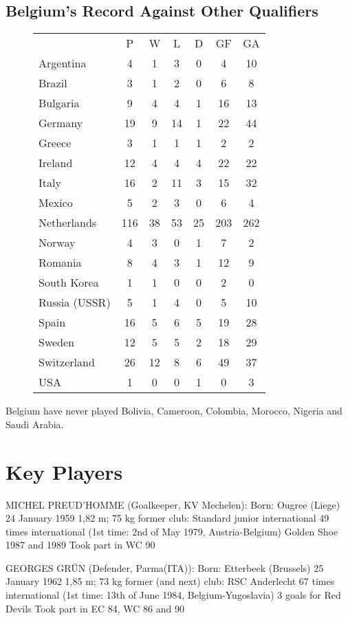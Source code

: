 \subsection{Belgium's Record Against Other Qualifiers}
\begin{figure}[H]
\begin{tabular}{l c c c c c c}
& P & W & L & D & GF & GA \\
Argentina & 4 & 1 & 3 & 0 & 4 & 10 \\
Brazil & 3 & 1 & 2 & 0 & 6 & 8 \\
Bulgaria & 9 & 4 & 4 & 1 & 16 & 13 \\
Germany & 19 & 9 & 14 & 1 & 22 & 44 \\
Greece & 3 & 1 & 1 & 1 & 2 &  2 \\
Ireland & 12 & 4 & 4 & 4 & 22 & 22 \\
Italy &16 & 2 & 11 & 3 & 15 & 32 \\
Mexico & 5 & 2 & 3 & 0 & 6 &  4 \\
Netherlands & 116 & 38 & 53 & 25 & 203 & 262 \\
Norway & 4 & 3 & 0 & 1 & 7 &  2 \\
Romania & 8 & 4 & 3 & 1 & 12 & 9 \\
South Korea & 1 & 1 & 0 & 0 & 2 &  0 \\
Russia (USSR) & 5 & 1 & 4 & 0 & 5 &  10 \\
Spain & 16 & 5 & 6 & 5 & 19 & 28 \\
Sweden & 12 & 5 & 5 & 2 & 18 & 29 \\
Switzerland & 26 & 12 & 8 & 6 & 49 & 37 \\
USA & 1 & 0 & 0 & 1 & 0 & 3 \\
\end{tabular}
\end{figure}
Belgium have never played Bolivia, Cameroon, Colombia, Morocco, Nigeria 
and Saudi Arabia.
\section{Key Players}
MICHEL PREUD'HOMME (Goalkeeper, KV Mechelen):
Born: Ougree (Liege) 24 January 1959
1,82 m; 75 kg
former club: Standard
junior international
49 times international (1st time: 2nd of May 1979, Austria-Belgium)
Golden Shoe 1987 and 1989
Took part in WC 90

GEORGES GR{\"U}N (Defender, Parma(ITA)):
Born: Etterbeek (Brussels) 25 January 1962
1,85 m; 73 kg
former (and next) club: RSC Anderlecht
67 times international (1st time: 13th of June 1984, Belgium-Yugoslavia)
3 goals for Red Devils
Took part in EC 84, WC 86 and 90


